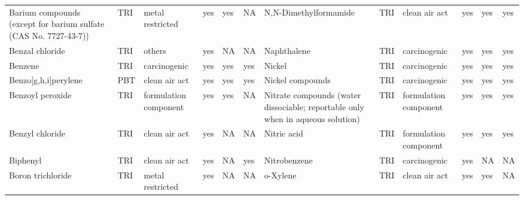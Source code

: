 \begin{table}[H]
{\begin{tabular}{llllllllllll}
            Barium compounds (except for barium sulfate (CAS No. 7727-43-7))           & TRI            & metal restricted & yes & yes & NA & N,N-Dimethylformamide & TRI & clean air act & yes & yes & yes\\
            Benzal chloride                                                            & TRI            & others                & yes    & NA      & NA   & Naphthalene                                                                                                        & TRI            & carcinogenic          & yes    & yes     & yes  \\
            Benzene                                                                    & TRI            & carcinogenic          & yes    & yes     & yes  & Nickel                                                                                                             & TRI            & carcinogenic          & yes    & yes     & yes  \\
            Benzo[g,h,i]perylene                                                       & PBT            & clean air act         & yes    & yes     & yes  & Nickel compounds                                                                                                   & TRI            & carcinogenic & yes & yes & yes\\
            Benzoyl peroxide                                                           & TRI            & formulation component & yes    & yes     & NA   & Nitrate compounds (water dissociable; reportable only when in aqueous solution) & TRI & formulation component & yes & yes & yes\\
            Benzyl chloride                                                            & TRI            & clean air act         & yes    & NA      & NA   & Nitric acid                                                                                                        & TRI            & formulation component & yes & yes & yes\\
            Biphenyl                                                                   & TRI            & clean air act         & yes    & NA      & yes  & Nitrobenzene                                                                                                       & TRI            & carcinogenic          & yes    & NA      & NA   \\
            Boron trichloride                                                          & TRI            & metal restricted      & yes    & NA      & NA   & o-Xylene                                                                                                           & TRI            & clean air act         & yes    & yes & NA\\

\end{tabular}}
\end{table}
